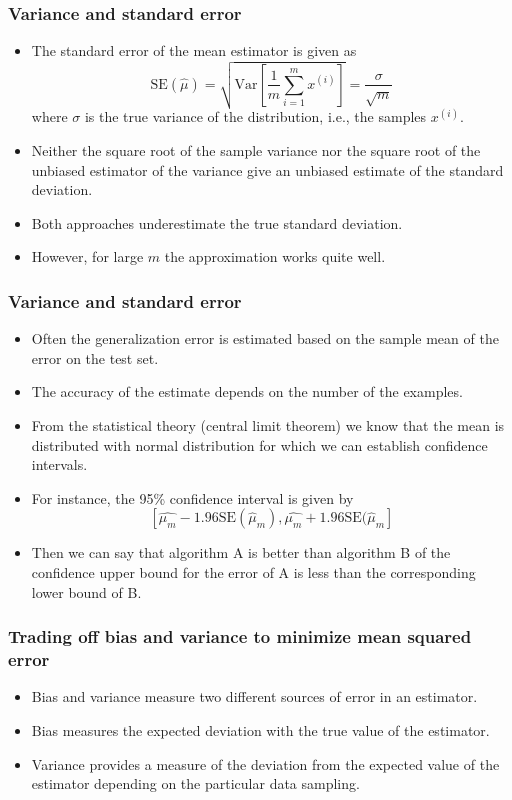 \documentclass[notes]{beamer}          %
\begin{document}
\begin{frame}
\frametitle{Variance and standard error}
    \begin{itemize}
        \item The standard error of the mean estimator is given as
        $$
        \mbox{SE}(\hat{\mu}) = \sqrt{\mbox{Var}\left[\frac{1}{m}\sum_{i=1}^m x^{(i)}\right]} = \frac{\sigma}{\sqrt{m}}
        $$
        where $\sigma$ is the true variance of the distribution, i.e., the samples $x^{(i)}$.
        \item Neither the square root of the sample variance nor the square root of the unbiased estimator of the variance give an unbiased estimate of the standard deviation.
        \item Both approaches underestimate the true standard deviation.
        \item However, for large $m$ the approximation works quite well.
    \end{itemize}
\end{frame}


\begin{frame}
\frametitle{Variance and standard error}
    \begin{itemize}
        \item Often the generalization error is estimated based on the sample mean of the error on the test set.
        \item The accuracy of the estimate depends on the number of the examples.
        \item From the statistical theory (central limit theorem) we know that the mean is distributed with normal distribution for which we can establish confidence intervals.
        \item For instance, the 95\% confidence interval is given by
        $$
        \left [ \hat{\mu_m} - 1.96 \mbox{SE}(\hat{\mu}_m), \hat{\mu_m} + 1.96 \mbox{SE}(\hat{\mu}_m \right ]
        $$
        \item Then we can say that algorithm A is better than algorithm B of the confidence upper bound for the error of A is less than the corresponding lower bound of B.
    \end{itemize}
\end{frame}


\begin{frame}
\frametitle{Trading off bias and variance to minimize  mean squared error}
    \begin{itemize}
        \item Bias and variance measure two different sources of error in an estimator.
        \item Bias measures the expected deviation with the true value of the estimator.
        \item Variance provides a measure of the deviation from the expected value of the estimator depending on the particular data sampling.
    \end{itemize}
\end{frame}
\end{document}
